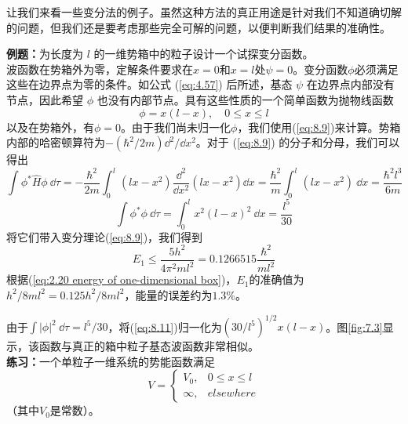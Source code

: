    让我们来看一些变分法的例子。虽然这种方法的真正用途是针对我们不知道确切解的问题，但我们还是要考虑那些完全可解的问题，以便判断我们结果的准确性。

    \begin{examplebox}
        \textbf{例题：}为长度为 $l$ 的一维势箱中的粒子设计一个试探变分函数。
        \\

        波函数在势箱外为零，定解条件要求在$x=0$和$x=l$处$\psi=0$。变分函数$\phi$必须满足这些在边界点为零的条件。如公式 (\ref{eq:4.57}) 后所述，基态 $\psi$ 在边界点内部没有节点，因此希望 $\phi$ 也没有内部节点。具有这些性质的一个简单函数为抛物线函数
        \begin{equation}
            \phi = x\left(l-x\right), \quad 0 \leq x \leq l
            \label{eq:8.11}
        \end{equation}
        以及在势箱外，有$\phi=0$。由于我们尚未归一化$\phi$，我们使用(\ref{eq:8.9})来计算。势箱内部的哈密顿算符为$-\left(\hbar^2/2m\right)\dd ^2/\dd x^2$。对于 (\ref{eq:8.9}) 的分子和分母，我们可以得出
        \begin{equation}
            \int \phi^{\ast} \hat{H}\phi \:\dd \tau = -\frac{\hbar^2}{2m} \int_{0}^{l} \left(lx-x^2\right)\frac{\dd ^2}{\dd x^2} \left(lx-x^2\right) \dd x = \frac{\hbar^2}{m} \int_0^l \left(lx-x^2\right) \:\dd x = \frac{\hbar^2 l^3}{6m}
            \label{eq:8.12}
        \end{equation}
        \begin{equation}
            \int \phi^{\ast} \phi \:\dd \tau = \int_0^l x^2\left(l-x\right)^2 \:\dd x = \frac{l^5}{30}
            \label{eq:8.13}
        \end{equation}
        将它们带入变分理论(\ref{eq:8.9})，我们得到
        \begin{equation*}
            E_1 \leq \frac{5h^2}{4\pi^2 ml^2} = 0.1266515\frac{\hbar^2}{ml^2}
        \end{equation*}
        根据(\ref{eq:2.20 energy of one-dimensional box})，$E_1$的准确值为$h^2/8ml^2=0.125h^2/8ml^2$，能量的误差约为$1.3\%$。

        由于$\int \left|\phi\right|^2 \: \dd \tau = l^5/30$，将(\ref{eq:8.11})归一化为$\left(30/l^5\right)^{1/2} x\left(l-x\right)$。图\ref{fig:7.3}显示，该函数与真正的箱中粒子基态波函数非常相似。
        \\

        \textbf{练习：}一个单粒子一维系统的势能函数满足
        \begin{equation*}
            V = \begin{cases}
                V_0, & 0 \leq x \leq l \\
                \infty, & elsewhere
            \end{cases}
        \end{equation*}
        （其中$V_0$是常数）。


\end{examplebox}
